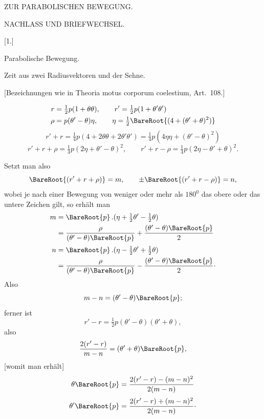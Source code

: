 \clearpage
\thispagestyle{empty}
\vspace*{1.6in}
\begin{center}
{\Large ZUR PARABOLISCHEN BEWEGUNG.\par}
\end{center}
\clearpage
{}
\begin{center}
{\large NACHLASS UND BRIEFWECHSEL.\par}
\par
\medskip
{}[1.]\par
\medskip
Parabolische Bewegung.\par
\medskip

Zeit aus zwei Radiusvektoren und der Sehne.
\medskip

[Bezeichnungen wie in Theoria motus corporum coelestium, Art.~108.]
\end{center}
\[
\begin{aligned}
r&=\tfrac{1}{2}p(1+\theta\theta),\qquad r'=\tfrac{1}{2}p(1+\theta'\theta')\\
\rho&=p(\theta'-\theta)\eta,\qquad \eta=\tfrac{1}{2}\BareRoot{(4+(\theta'+\theta)^2)}
\end{aligned}
\]
\[
r'+r=\tfrac{1}{4}p(4+2\theta\theta+2\theta'\theta')=\tfrac{1}{4}p(4\eta\eta+(\theta'-\theta)^2)
\]
\[
r'+r+\rho=\tfrac{1}{4}p(2\eta+\theta'-\theta)^2,\qquad
r'+r-\rho=\tfrac{1}{4}p(2\eta-\theta'+\theta)^2.
\]

Setzt man also
\[
\BareRoot{(r'+r+\rho)}=m,\qquad \pm\BareRoot{(r'+r-\rho)}=n,
\]
wobei je nach einer Bewegung von weniger oder mehr als \(180^0\) das obere oder das untere Zeichen gilt, so erhält man
\[
\begin{aligned}
m&=\BareRoot{p}\,.(\eta+\tfrac{1}{2}\theta'-\tfrac{1}{2}\theta)\\
&=\frac{\rho}{(\theta'-\theta)\BareRoot{p}}+\frac{(\theta'-\theta)\BareRoot{p}}{2}\\[.5ex]
n&=\BareRoot{p}\,.(\eta-\tfrac{1}{2}\theta'+\tfrac{1}{2}\theta)\\
&=\frac{\rho}{(\theta'-\theta)\BareRoot{p}}-\frac{(\theta'-\theta)\BareRoot{p}}{2}\mathpunct{\cdot}
\end{aligned}
\]
Also
\[
m-n=(\theta'-\theta)\BareRoot{p};
\]
ferner ist
\[
r'-r=\tfrac{1}{2}p(\theta'-\theta)(\theta'+\theta),
\]
also
\[
\frac{2(r'-r)}{m-n}=(\theta'+\theta)\BareRoot{p},
\]
[womit man erhält]
\[
\begin{aligned}
\theta\BareRoot{p}&=\frac{2(r'-r)-(m-n)^2}{2(m-n)}\\[.5ex]
\theta'\BareRoot{p}&=\frac{2(r'-r)+(m-n)^2}{2(m-n)}\mathpunct{\cdot}
\end{aligned}
\]

